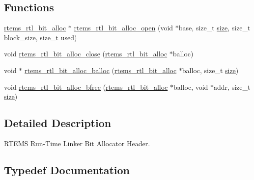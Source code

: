 \subsection*{Functions}
\begin{DoxyCompactItemize}
\item 
\mbox{\hyperlink{structrtems__rtl__bit__alloc}{rtems\+\_\+rtl\+\_\+bit\+\_\+alloc}} $\ast$ \mbox{\hyperlink{rtl-bit-alloc_8h_a68fb715e86083d53b06b7381b4f0645b}{rtems\+\_\+rtl\+\_\+bit\+\_\+alloc\+\_\+open}} (void $\ast$base, size\+\_\+t \mbox{\hyperlink{sun4u_2tte_8h_a245260f6f74972558f61b85227df5aae}{size}}, size\+\_\+t block\+\_\+size, size\+\_\+t used)
\item 
void \mbox{\hyperlink{rtl-bit-alloc_8h_ae20e516fc07b19dc0d56f5ed4a83e677}{rtems\+\_\+rtl\+\_\+bit\+\_\+alloc\+\_\+close}} (\mbox{\hyperlink{structrtems__rtl__bit__alloc}{rtems\+\_\+rtl\+\_\+bit\+\_\+alloc}} $\ast$balloc)
\item 
void $\ast$ \mbox{\hyperlink{rtl-bit-alloc_8h_a4efbf95039225f1c361636877a9df6b3}{rtems\+\_\+rtl\+\_\+bit\+\_\+alloc\+\_\+balloc}} (\mbox{\hyperlink{structrtems__rtl__bit__alloc}{rtems\+\_\+rtl\+\_\+bit\+\_\+alloc}} $\ast$balloc, size\+\_\+t \mbox{\hyperlink{sun4u_2tte_8h_a245260f6f74972558f61b85227df5aae}{size}})
\item 
void \mbox{\hyperlink{rtl-bit-alloc_8h_aa895314e00bf91d5561c34e032f3ff58}{rtems\+\_\+rtl\+\_\+bit\+\_\+alloc\+\_\+bfree}} (\mbox{\hyperlink{structrtems__rtl__bit__alloc}{rtems\+\_\+rtl\+\_\+bit\+\_\+alloc}} $\ast$balloc, void $\ast$addr, size\+\_\+t \mbox{\hyperlink{sun4u_2tte_8h_a245260f6f74972558f61b85227df5aae}{size}})
\end{DoxyCompactItemize}


\subsection{Detailed Description}
R\+T\+E\+MS Run-\/\+Time Linker Bit Allocator Header. 



\subsection{Typedef Documentation}
\mbox{\label{rtl-bit-alloc_8h_a63f47aa162bf211a4abcb9825b966f75}} 
